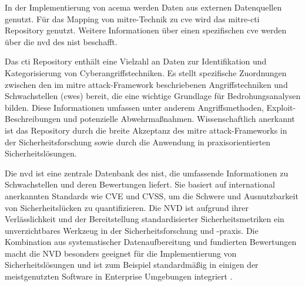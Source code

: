 %
\par In der Implementierung von \gls{acema} werden Daten aus externen Datenquellen genutzt. Für das Mapping von \gls{mitre}-Technik zu \gls{cve} wird das \gls{mitre}-\gls{cti} Repository genutzt. Weitere Informationen über einen spezifischen \gls{cve} werden über die \gls{nvd} des \gls{nist} beschafft.
\par Das \gls{cti} Repository enthält eine Vielzahl an Daten zur Identifikation und Kategorisierung von Cyberangriffstechniken. Es stellt spezifische Zuordnungen zwischen den im \gls{mitre} \gls{attack}-Framework beschriebenen Angriffstechniken und Schwachstellen (\glspl{cwe}) bereit, die eine wichtige Grundlage für Bedrohungsanalysen bilden. Diese Informationen umfassen unter anderem Angriffsmethoden, Exploit-Beschreibungen und potenzielle Abwehrmaßnahmen. Wissenschaftlich anerkannt ist das Repository durch die breite Akzeptanz des \gls{mitre} \gls{attack}-Frameworks in der Sicherheitsforschung sowie durch die Anwendung in praxisorientierten Sicherheitslösungen.
\par Die \gls{nvd} ist eine zentrale Datenbank des \gls{nist}, die umfassende Informationen zu Schwachstellen und deren Bewertungen liefert. Sie basiert auf international anerkannten Standards wie CVE und CVSS, um die Schwere und Ausnutzbarkeit von Sicherheitslücken zu quantifizieren. Die NVD ist aufgrund ihrer Verlässlichkeit  und der Bereitstellung standardisierter Sicherheitsmetriken ein unverzichtbares Werkzeug in der Sicherheitsforschung und -praxis. Die Kombination aus systematischer Datenaufbereitung und fundierten Bewertungen macht die NVD besonders geeignet für die Implementierung von Sicherheitslösungen und ist zum Beispiel standardmäßig in einigen der meistgenutzten Software in Enterprise Umgebungen integriert \autocite{AssetsNVDIntegration,InformationenNVDIntegrationen}.